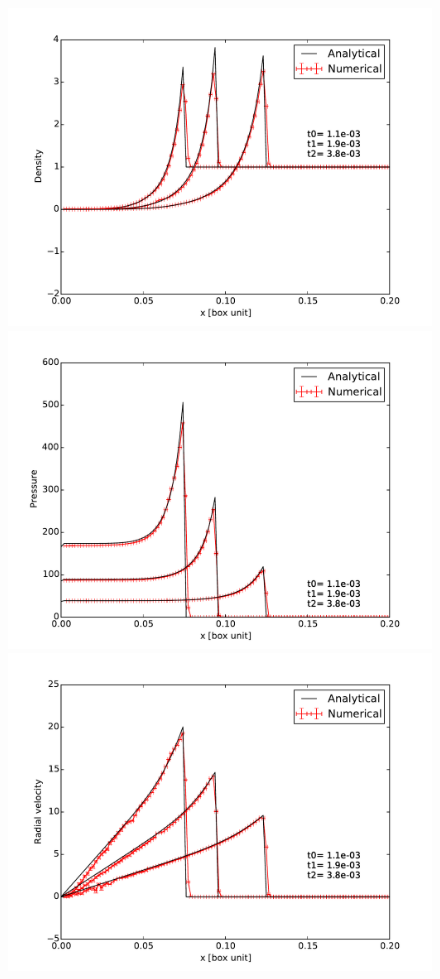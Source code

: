 \begin{figure}
   \begin{minipage}[c]{.5\linewidth}
        \includegraphics[width=\textwidth]{img/03/sedov/sedov_evol_8_den_lin.pdf} 
		\includegraphics[width=\textwidth]{img/03/sedov/sedov_evol_8_pres.pdf} 
		\includegraphics[width=\textwidth]{img/03/sedov/sedov_evol_8_vel.pdf} 


\end{minipage}
\end{figure}

